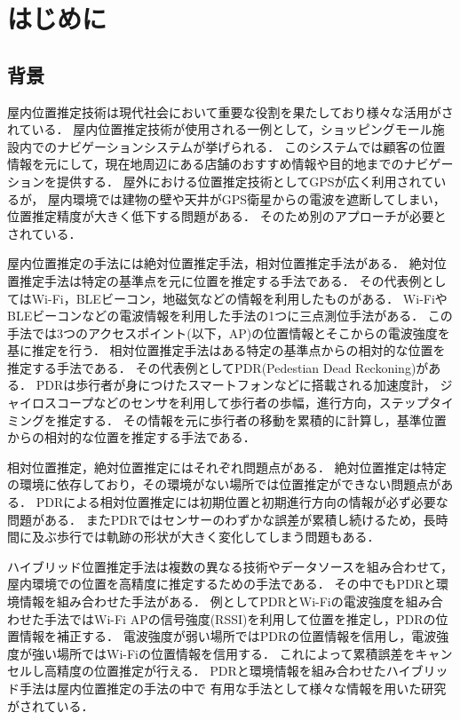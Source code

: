\chapter{はじめに}
\thispagestyle{myheadings}


\section{背景}


屋内位置推定技術は現代社会において重要な役割を果たしており様々な活用がされている．
屋内位置推定技術が使用される一例として，ショッピングモール施設内でのナビゲーションシステムが挙げられる\cite{burasapo}．
このシステムでは顧客の位置情報を元にして，現在地周辺にある店舗のおすすめ情報や目的地までのナビゲーションを提供する．
屋外における位置推定技術としてGPSが広く利用されているが，
屋内環境では建物の壁や天井がGPS衛星からの電波を遮断してしまい，
位置推定精度が大きく低下する問題がある．
そのため別のアプローチが必要とされている．

屋内位置推定の手法には絶対位置推定手法，相対位置推定手法がある．
絶対位置推定手法は特定の基準点を元に位置を推定する手法である．
その代表例としてはWi-Fi，BLEビーコン，地磁気などの情報を利用したものがある．
Wi-FiやBLEビーコンなどの電波情報を利用した手法の1つに三点測位手法がある．
この手法では3つのアクセスポイント(以下，AP)の位置情報とそこからの電波強度を基に推定を行う．
相対位置推定手法はある特定の基準点からの相対的な位置を推定する手法である．
その代表例としてPDR(Pedestian Dead Reckoning)がある．
PDRは歩行者が身につけたスマートフォンなどに搭載される加速度計，
ジャイロスコープなどのセンサを利用して歩行者の歩幅，進行方向，ステップタイミングを推定する．
その情報を元に歩行者の移動を累積的に計算し，基準位置からの相対的な位置を推定する手法である．

相対位置推定，絶対位置推定にはそれぞれ問題点がある．
絶対位置推定は特定の環境に依存しており，その環境がない場所では位置推定ができない問題点がある．
PDRによる相対位置推定には初期位置と初期進行方向の情報が必ず必要な問題がある．
またPDRではセンサーのわずかな誤差が累積し続けるため，長時間に及ぶ歩行では軌跡の形状が大きく変化してしまう問題もある．

ハイブリッド位置推定手法は複数の異なる技術やデータソースを組み合わせて，
屋内環境での位置を高精度に推定するための手法である．
その中でもPDRと環境情報を組み合わせた手法がある．
例としてPDRとWi-Fiの電波強度を組み合わせた手法ではWi-Fi APの信号強度(RSSI)を利用して位置を推定し，PDRの位置情報を補正する．
電波強度が弱い場所ではPDRの位置情報を信用し，電波強度が強い場所ではWi-Fiの位置情報を信用する．
これによって累積誤差をキャンセルし高精度の位置推定が行える．
PDRと環境情報を組み合わせたハイブリッド手法は屋内位置推定の手法の中で
有用な手法として様々な情報を用いた研究がされている．



